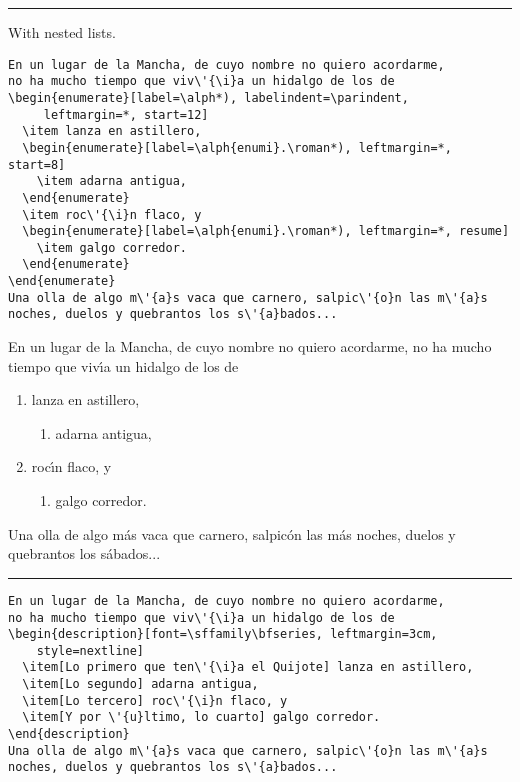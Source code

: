 \documentclass{article}
\begin{document}
\vskip6pt
\goodbreak
\hrule
\vskip6pt

With nested lists.

\begin{verbatim}
En un lugar de la Mancha, de cuyo nombre no quiero acordarme,
no ha mucho tiempo que viv\'{\i}a un hidalgo de los de
\begin{enumerate}[label=\alph*), labelindent=\parindent,
     leftmargin=*, start=12]
  \item lanza en astillero,
  \begin{enumerate}[label=\alph{enumi}.\roman*), leftmargin=*, start=8]
    \item adarna antigua,
  \end{enumerate}
  \item roc\'{\i}n flaco, y
  \begin{enumerate}[label=\alph{enumi}.\roman*), leftmargin=*, resume]
    \item galgo corredor.
  \end{enumerate}
\end{enumerate}
Una olla de algo m\'{a}s vaca que carnero, salpic\'{o}n las m\'{a}s
noches, duelos y quebrantos los s\'{a}bados...
\end{verbatim}

En un lugar de la Mancha, de cuyo nombre no quiero acordarme,
no ha mucho tiempo que viv\'{\i}a un hidalgo de los de
\begin{enumerate}[label=\alph*), labelindent=\parindent,
     leftmargin=*, start=12]
\item lanza en astillero,
\begin{enumerate}[label=\alph{enumi}.\roman*), leftmargin=*, start=7]
\item adarna antigua,
\end{enumerate}
\item roc\'{\i}n flaco, y
\begin{enumerate}[label=\alph{enumi}.\roman*), leftmargin=*, resume]
\item galgo corredor.
\end{enumerate}
\end{enumerate}
Una olla de algo m\'{a}s vaca que carnero, salpic\'{o}n las m\'{a}s
noches, duelos y quebrantos los s\'{a}bados...

\vskip6pt
\goodbreak
\hrule
\vskip6pt


\begin{verbatim}
En un lugar de la Mancha, de cuyo nombre no quiero acordarme,
no ha mucho tiempo que viv\'{\i}a un hidalgo de los de
\begin{description}[font=\sffamily\bfseries, leftmargin=3cm,
    style=nextline]
  \item[Lo primero que ten\'{\i}a el Quijote] lanza en astillero,
  \item[Lo segundo] adarna antigua,
  \item[Lo tercero] roc\'{\i}n flaco, y
  \item[Y por \'{u}ltimo, lo cuarto] galgo corredor.
\end{description}
Una olla de algo m\'{a}s vaca que carnero, salpic\'{o}n las m\'{a}s
noches, duelos y quebrantos los s\'{a}bados...
\end{verbatim}
\end{document}
